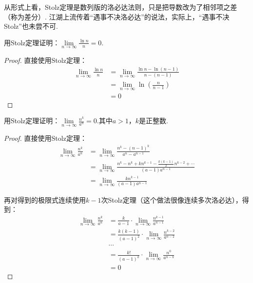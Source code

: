 从形式上看，Stolz定理是数列版的洛必达法则，只是把导数改为了相邻项之差（称为差分）. 江湖上流传着“遇事不决洛必达”的说法，实际上，“遇事不决Stolz”也未尝不可.

\begin{example}
\label{ex:ch01-31}
用Stolz定理证明：$\lim\limits_{n \to \infty}\displaystyle\frac{\ln n}{n}=0$.
\end{example}

\begin{proof}
直接使用Stolz定理：
\begin{equation}
    \begin{aligned}
        \lim\limits_{n \to \infty}\frac{\ln n}{n}
        &= \lim\limits_{n \to \infty}\frac{\ln n - \ln (n-1)}{n-(n-1)} \\
        &= \lim\limits_{n \to \infty}\ln\left(\frac{n}{n-1} \right) \\
        &= 0
        \nonumber
    \end{aligned}
\end{equation}
\end{proof}

\begin{example}
\label{ex:ch01-32}
用Stolz定理证明：$\lim\limits_{n \to \infty}\displaystyle\frac{n^{k}}{a^{n}}=0$.其中$a>1$，$k$是正整数.
\end{example}

\begin{proof}
直接使用Stolz定理：
\begin{equation}
    \begin{aligned}
        \lim\limits_{n \to \infty}\frac{n^{k}}{a^{n}}
        &= \lim\limits_{n \to \infty}\frac{n^{k}-(n-1)^{k}}{a^{n}-a^{n-1}} \\
        &= \lim\limits_{n \to \infty}\frac{n^{k}-n^{k} +kn^{k-1}-\frac{k(k-1)}{2}n^{k-2}+\cdots}{(a-1)a^{n-1}} \\
        &= \lim\limits_{n \to \infty}\frac{kn^{k-1}}{(a-1)a^{n-1}}
        \nonumber
    \end{aligned}
\end{equation}\par
再对得到的极限式连续使用$k-1$次Stolz定理（这个做法很像连续多次洛必达），得到：
\begin{equation}
    \begin{aligned}
        \lim\limits_{n \to \infty}\frac{n^{k}}{a^{n}}
        &= \frac{k}{a-1}\cdot \lim\limits_{n \to \infty}\frac{n^{k-1}}{a^{n-1}}\\
        &= \frac{k(k-1)}{(a-1)^2}\cdot \lim\limits_{n \to \infty}\frac{n^{k-2}}{a^{n-2}}\\
        ~~~~&\cdots\\
        &= \frac{k!}{(a-1)^k} \cdot \lim\limits_{n \to \infty}\frac{n^{0}}{a^{n-k}}\\
        &= 0
        \nonumber
    \end{aligned}
\end{equation}
\end{proof}

